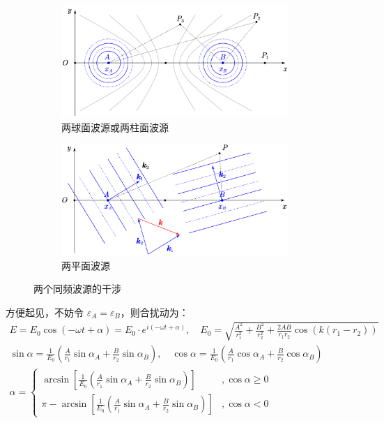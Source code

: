 \documentclass[UTF8]{report}
\theoremstyle{MyLineTheoremStyle} %
\theoremstyle{MyBlockTheoremStyle} %
\theoremstyle{MySubsubsectionStyle} %
\begin{document}
\begin{figure}[H]\centering
    \begin{subfigure}[t]{0.49\columnwidth}\centering
        \includegraphics[height=120pt]{assets/3/两球面波源或两柱面波源.pdf}
        \caption{ 两球面波源或两柱面波源 }
    \end{subfigure}\hfill
    \begin{subfigure}[t]{0.49\columnwidth}\centering
        \includegraphics[height=120pt]{assets/3/双平面波源.pdf}
        \caption{ 两平面波源 }
    \end{subfigure}
    \caption{ 两个同频波源的干涉 }\label{两个同频波源的干涉}
\end{figure}


方便起见，不妨令 $\varepsilon_A = \varepsilon_B$，则合扰动为：
\begin{gather}
E = E_0 \cos \left(-\omega t + \alpha \right) = E_0 \cdot e^{i(-\omega t + \alpha)},\quad E_0 = \sqrt{\frac{A^2}{r_1^2} + \frac{B^2}{r_2^2} + \frac{2AB}{r_1r_2}\cos\left( k \left( r_1  - r_2 \right)\right)} \\ 
\sin \alpha = \frac{1}{E_0} \left( \frac{A}{ r_1 }\sin \alpha_A + \frac{B}{ r_2 } \sin \alpha_B\right),\quad \cos \alpha = \frac{1}{E_0} \left( \frac{A}{ r_1 }\cos \alpha_A + \frac{B}{ r_2 } \cos \alpha_B\right)\\ 
\alpha = 
\begin{cases}
    \arcsin \left[ \frac{1}{E_0} \left( \frac{A}{ r_1 }\sin \alpha_A + \frac{B}{ r_2 } \sin \alpha_B\right) \right] &, \cos \alpha \geqslant 0 \\
    \pi - \arcsin \left[ \frac{1}{E_0} \left( \frac{A}{ r_1 }\sin \alpha_A + \frac{B}{ r_2 } \sin \alpha_B\right) \right] &,  \cos \alpha < 0
\end{cases}
\end{gather}
\end{document}
